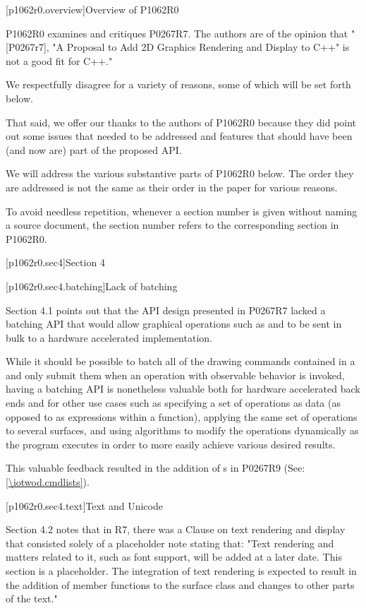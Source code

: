 
[p1062r0.overview]{Overview of P1062R0}

\pnum
P1062R0 examines and critiques P0267R7. The authors are of the opinion that "[P0267r7], "A Proposal to Add 2D Graphics Rendering and Display to C++" is not a good fit for C++."

\pnum
We respectfully disagree for a variety of reasons, some of which will be set forth below.

\pnum
That said, we offer our thanks to the authors of P1062R0 because they did point out some issues that needed to be addressed and features that should have been (and now are) part of the proposed API.

\pnum
We will address the various substantive parts of P1062R0 below. The order they are addressed is not the same as their order in the paper for various reasons.

\pnum
To avoid needless repetition, whenever a section number is given without naming a source document, the section number refers to the corresponding section in P1062R0. 

[p1062r0.sec4]{Section 4}

[p1062r0.sec4.batching]{Lack of batching}

\pnum
Section 4.1 points out that the API design presented in P0267R7 lacked a batching API that would allow graphical operations such as  and  to be sent in bulk to a hardware accelerated implementation.

\pnum
While it should be possible to batch all of the drawing commands contained in a  and only submit them when an operation with observable behavior is invoked, having a batching API is nonetheless valuable both for hardware accelerated back ends and for other use cases such as specifying a set of operations as data (as opposed to as expressions within a function), applying the same set of operations to several surfaces, and using algorithms to modify the operations dynamically as the program executes in order to more easily achieve various desired results.

\pnum
This valuable feedback resulted in the addition of s in P0267R9 (See: \ref{\iotwod.cmdlists}).

[p1062r0.sec4.text]{Text and Unicode}

\pnum
Section 4.2 notes that in R7, there was a Clause on text rendering and display that consisted solely of a placeholder note stating that: "Text rendering and matters related to it, such as font support, will be added at a later date. This section is a placeholder. The integration of text rendering is expected to result in the addition of member functions to the surface class and changes to other parts of the text."

